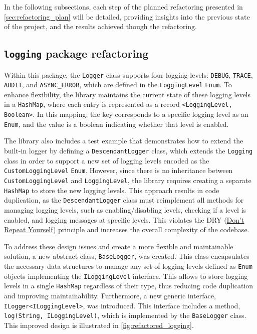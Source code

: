 In the following subsections, each step of the planned refactoring presented in \autoref{sec:refactoring_plan} will be detailed, providing insights into the previous state of the project, and the results achieved though the refactoring.

\subsection{\texttt{logging} package refactoring}

Within this package, the \texttt{Logger} class supports four logging levels: \texttt{DEBUG}, \texttt{TRACE}, \texttt{AUDIT}, and \texttt{ASYNC\_ERROR}, which are defined in the \texttt{LoggingLevel} \texttt{Enum}. To enhance flexibility, the library maintains the current state of these logging levels in a \texttt{HashMap}, where each entry is represented as a record \texttt{<LoggingLevel, Boolean>}. In this mapping, the key corresponds to a specific logging level as an \texttt{Enum}, and the value is a boolean indicating whether that level is enabled.

The library also includes a test example that demonstrates how to extend the built-in logger by defining a \texttt{DescendantLogger} class, which extends the \texttt{Logging} class in order to support a new set of logging levels encoded as the \texttt{CustomLoggingLevel} \texttt{Enum}. However, since there is no inheritance between \texttt{CustomLoggingLevel} and \texttt{LoggingLevel}, the library requires creating a separate \texttt{HashMap} to store the new logging levels. This approach results in code duplication, as the \texttt{DescendantLogger} class must reimplement all methods for managing logging levels, such as enabling/disabling levels, checking if a level is enabled, and logging messages at specific levels. This violates the DRY (\href{https://en.wikipedia.org/wiki/Don%27\_repeat\_yourself}{Don't Repeat Yourself}) principle and increases the overall complexity of the codebase.

To address these design issues and create a more flexible and maintainable solution, a new abstract class, \texttt{BaseLogger}, was created. This class encapsulates the necessary data structures to manage any set of logging levels defined as \texttt{Enum} objects implementing the \texttt{ILoggingLevel} interface. This allows to store logging levels in a single \texttt{HashMap} regardless of their type, thus reducing code duplication and improving maintainability. Furthermore, a new generic interface, \texttt{ILogger<ILoggingLevel>}, was introduced. This interface includes a method, \texttt{log(String, ILoggingLevel)}, which is implemented by the \texttt{BaseLogger} class. This improved design is illustrated in \autoref{fig:refactored_logging}.


